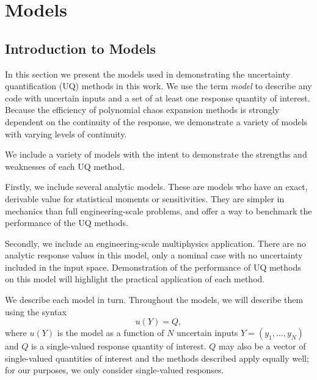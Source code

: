 
\chapter{Models} %

\label{Chapter2} %



\section{Introduction to Models}
In this section we present the models used in demonstrating the uncertainty quantification (UQ) methods in this
work.  We use the term \emph{model} to describe any code with uncertain inputs and a set of at least one
response quantity of interest.  Because the efficiency of polynomial chaos expansion methods is strongly dependent on the continuity
of the response, we demonstrate a variety of models with varying levels of continuity.

We include a variety of models with the intent to demonstrate the strengths and weaknesses of each UQ
method.

Firstly, we include several analytic models.  These are models who have an exact, derivable value for
statistical moments or sensitivities.  They are simpler in mechanics than full engineering-scale problems, and
offer a way to benchmark the performance of the UQ methods.

Secondly, we include an engineering-scale multiphysics application.  There are no analytic response values in
this model, only a nominal case with no uncertainty included in the input space.  Demonstration of the
performance of UQ methods on this model will highlight the practical application of each method.

We describe each model in turn.  Throughout the models, we will describe them using the syntax
\begin{equation}
  u(Y) = Q,
\end{equation}
where $u(Y)$ is the model as a function of $N$ uncertain inputs $Y=(y_1,\ldots,y_N)$ and $Q$ is a
single-valued response quantity of interest.  $Q$ may also be a vector of single-valued quantities of interest and the methods
described apply equally well; for our purposes, we only consider single-valued responses.

